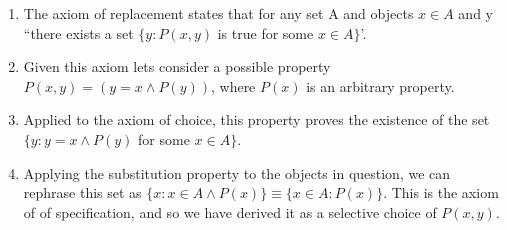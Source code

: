 \documentclass{article}
\begin{document}
\begin{enumerate}
\begin{enumerate}
                \item The axiom of replacement states that for any set A and
                    objects $x \in A$ and y ``there exists a set $\{y : P(x, y)$
                    is true for some $x \in A\}$'.
                \item Given this axiom lets consider a possible property $P(x,y) = (y = x \land P(y))$, where
                    $P(x)$ is an arbitrary property.
                \item Applied to the axiom of choice, this property proves the
                    existence of the set $\{y : y = x \land P(y) $ for some $x
                    \in A\}$. 
                \item Applying the substitution property to the objects in
                    question, we can rephrase this set as $\{x: x \in A \land
                    P(x)\} \equiv \{x \in A: P(x)\}$. This is the axiom of 
                    of specification, and so we have derived it as a selective
                    choice of $P(x,y)$.
            \end{enumerate}
    \end{enumerate}
\end{document}
